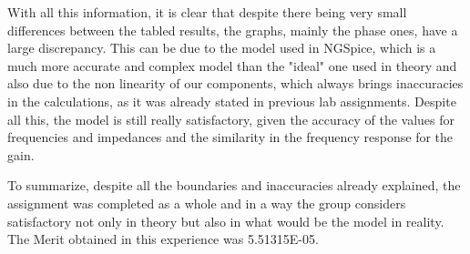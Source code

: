 \par With all this information, it is clear that despite there being very small differences between the tabled results, the graphs, mainly the phase ones, have a large discrepancy. This can be due to the model used in NGSpice, which is a much more accurate and complex model than the "ideal" one used in theory and also due to the non linearity of our components, which always brings inaccuracies in the calculations, as it was already stated in previous lab assignments. Despite all this, the model is still really satisfactory, given the accuracy of the values for frequencies and impedances and the similarity in the frequency response for the gain.
\par To summarize, despite all the boundaries and inaccuracies already explained, the assignment was completed as a whole and in a way the group considers satisfactory not only in theory but also in what would be the model in reality. The Merit obtained in this experience was 5.51315E-05.
